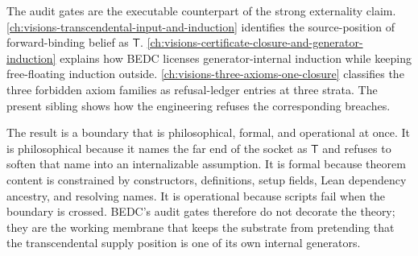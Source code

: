 The audit gates are the executable counterpart of the strong externality claim. \autoref{ch:visions-transcendental-input-and-induction} identifies the source-position of forward-binding belief as $\mathsf{T}$. \autoref{ch:visions-certificate-closure-and-generator-induction} explains how BEDC licenses generator-internal induction while keeping free-floating induction outside. \autoref{ch:visions-three-axioms-one-closure} classifies the three forbidden axiom families as refusal-ledger entries at three strata. The present sibling shows how the engineering refuses the corresponding breaches.

The result is a boundary that is philosophical, formal, and operational at once. It is philosophical because it names the far end of the socket as $\mathsf{T}$ and refuses to soften that name into an internalizable assumption. It is formal because theorem content is constrained by constructors, definitions, setup fields, Lean dependency ancestry, and resolving names. It is operational because scripts fail when the boundary is crossed. BEDC's audit gates therefore do not decorate the theory; they are the working membrane that keeps the substrate from pretending that the transcendental supply position is one of its own internal generators.
